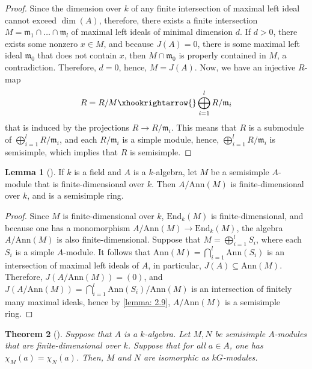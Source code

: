 \documentclass[12pt,a4paper]{report}
\newtheorem{theorem}{Theorem}[chapter]
\theoremstyle{definition}
\newtheorem{lemma}[theorem]{Lemma}
\theoremstyle{remark}
\theoremstyle{definition}
\begin{document}
\begin{proof}
    Since the dimension over $k$ of any finite intersection of maximal left ideal cannot exceed $\dim(A)$, therefore, there exists a finite intersection $M = \mathfrak{m}_1\cap \ldots\cap \mathfrak{m}_l$ of maximal left ideals of minimal dimension $d$. If $d>0$, there exists some nonzero $x\in M$, and because $J(A) = 0$, there is some maximal left ideal $\mathfrak{m}_0$ that does not contain $x$, then $M\cap \mathfrak{m}_0$ is properly contained in $M$, a contradiction. Therefore, $d=0$, hence, $M = J(A)$. Now, we have an injective $R$-map
    \begin{equation*}
        R = R/M \xhookrightarrow{} \bigoplus\limits_{i=1}^{l}R/\mathfrak{m}_i
    \end{equation*}
    that is induced by the projections $R\to R/\mathfrak{m}_i$. This means that $R$ is a submodule of $\bigoplus\limits_{i=1}^{l}R/\mathfrak{m}_i$, and each $R/\mathfrak{m}_i$ is a simple module, hence, $\bigoplus\limits_{i=1}^{l}R/\mathfrak{m}_i$ is semisimple, which implies that $R$ is semisimple.
\end{proof}
\begin{lemma}[{\cite[Lemma 2.11]{eggermont_generalizations_2011}}]\label{lemma: 2.11}
If $k$ is a field and $A$ is a $k$-algebra, let $M$ be a semisimple $A$-module that is finite-dimensional over $k$. Then $A/\mathrm{Ann}(M)$ is finite-dimensional over $k$, and is a semisimple ring.
\end{lemma}
\begin{proof}
    Since $M$ is finite-dimensional over $k$, $\mathrm{End}_k(M)$ is finite-dimensional, and because one has a monomorphism $A/\mathrm{Ann}(M) \to \mathrm{End}_k(M)$, the algebra $A/\mathrm{Ann}(M)$ is also finite-dimensional.\smallbreak
    Suppose that $M = \bigoplus\limits_{i=1}^l S_i$, where each $S_i$ is a simple $A$-module. It follows that $\mathrm{Ann}(M) = \bigcap\limits_{i=1}^l \mathrm{Ann}(S_i)$ is an intersection of maximal left ideals of $A$, in particular, $J(A)\subseteq \mathrm{Ann}(M)$. Therefore, $J(A/\mathrm{Ann}(M)) = (0)$, and $J(A/\mathrm{Ann}(M)) = \bigcap\limits_{i=1}^l \mathrm{Ann}(S_i)/\mathrm{Ann}(M)$ is an intersection of finitely many maximal ideals, hence by \cref{lemma: 2.9}, $A/\mathrm{Ann}(M)$ is a semisimple ring. 
\end{proof}
\begin{theorem}[{\cite[Theorem 5.10]{eggermont_generalizations_2011}}]\label{thm: 5.10}
Suppose that $A$ is a $k$-algebra. Let $M, N$ be semisimple $A$-modules that are finite-dimensional over $k$. Suppose that for all $a \in A$, one has $\chi_{M}(a)=\chi_{N}(a)$. Then, $M$ and $N$ are isomorphic as $kG$-modules.
\end{theorem}
\end{document}
